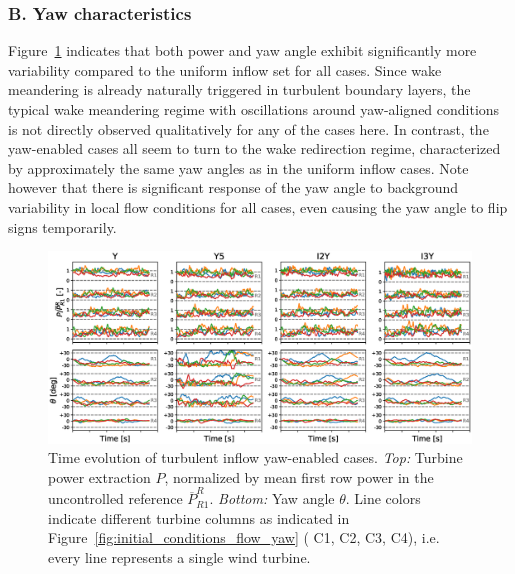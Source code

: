 	\subsubsection{B. Yaw characteristics}
	 Figure~\ref{fig:dynamic_turb} indicates that both power and yaw angle exhibit significantly more variability compared to the uniform inflow set for all cases. Since wake meandering is already naturally triggered in turbulent boundary layers, the typical wake meandering regime with oscillations around yaw-aligned conditions is not directly observed qualitatively for any of the cases here. In contrast, the yaw-enabled cases all seem to turn to the wake redirection regime, characterized by approximately the same yaw angles as in the uniform inflow cases. Note however that there is significant response of the yaw angle to background variability in local flow conditions for all cases, even causing the yaw angle to flip signs temporarily. 
	\begin{figure}
		\includegraphics[width=\textwidth]{chapters/optimal_yaw_control/power_yaw_turb.eps}	
		\caption[Time evolution of turbulent inflow yaw-enabled cases.]{Time evolution of turbulent inflow yaw-enabled cases. \emph{Top: } Turbine power extraction $P$, normalized by mean first row power in the uncontrolled reference $\overline{P}_{R1}^R$. \emph{Bottom: } Yaw angle $\theta$. Line colors indicate different turbine columns as indicated in Figure~\ref{fig:initial_conditions_flow_yaw} ({\color{C1} C1}, {\color{C2} C2}, {\color{C3} C3}, {\color{C4} C4}), i.e. every line represents a single wind turbine. \label{fig:dynamic_turb}}
	\end{figure}


